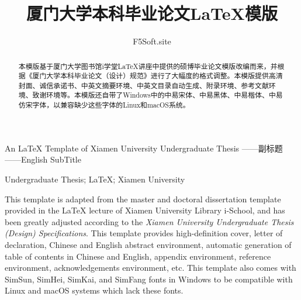\documentclass{xmu}
\begin{document}
\print




\title{厦门大学本科毕业论文LaTeX模版}
{An LaTeX Template of Xiamen University Undergraduate Thesis}
{——副标题}
{——English SubTitle}

\author{F5Soft.site}



\subject{计算机科学与技术}





{Undergraduate Thesis; LaTeX; Xiamen University}

\maketitle



\begin{abstract}
    本模版基于厦门大学图书馆i学堂LaTeX讲座中提供的硕博毕业论文模版\cite{xmuischool}改编而来，并根据《厦门大学本科毕业论文（设计）规范》\cite{xmuthesis}进行了大幅度的格式调整。本模版提供高清封面、诚信承诺书、中英文摘要环境、中英文目录自动生成、附录环境、参考文献环境、致谢环境等。本模版还自带了Windows中的中易宋体、中易黑体、中易楷体、中易仿宋字体，以兼容缺少这些字体的Linux和macOS系统。
\end{abstract}

\begin{enabstract}
    This template is adapted from the master and doctoral dissertation template provided in the LaTeX lecture of Xiamen University Library i-School\cite{xmuischool}, and has been greatly adjusted according to the \textit{Xiamen University Undergraduate Thesis (Design) Specifications}\cite{xmuthesis}. This template provides high-definition cover, letter of declaration, Chinese and English abstract environment, automatic generation of table of contents in Chinese and English, appendix environment, reference environment, acknowledgements environment, etc. This template also comes with SimSun, SimHei, SimKai, and SimFang fonts in Windows to be compatible with Linux and macOS systems which lack these fonts.
\end{enabstract}
\end{document}
